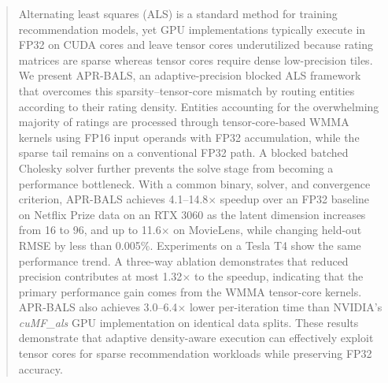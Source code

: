 \begin{abstract}
Alternating least squares (ALS) is a standard method for training recommendation models, yet GPU implementations typically execute in FP32 on CUDA cores and leave tensor cores underutilized because rating matrices are sparse whereas tensor cores require dense low-precision tiles. We present APR-BALS, an adaptive-precision blocked ALS framework that overcomes this sparsity–tensor-core mismatch by routing entities according to their rating density. Entities accounting for the overwhelming majority of ratings are processed through tensor-core-based WMMA kernels using FP16 input operands with FP32 accumulation, while the sparse tail remains on a conventional FP32 path. A blocked batched Cholesky solver further prevents the solve stage from becoming a performance bottleneck. With a common binary, solver, and convergence criterion, APR-BALS achieves 4.1--14.8$\times$ speedup over an FP32 baseline on Netflix Prize data on an RTX 3060 as the latent dimension increases from 16 to 96, and up to 11.6$\times$ on MovieLens, while changing held-out RMSE by less than 0.005\%. Experiments on a Tesla T4 show the same performance trend. A three-way ablation demonstrates that reduced precision contributes at most 1.32$\times$ to the speedup, indicating that the primary performance gain comes from the WMMA tensor-core kernels. APR-BALS also achieves 3.0--6.4$\times$ lower per-iteration time than NVIDIA's \textit{cuMF\_als} GPU implementation on identical data splits. These results demonstrate that adaptive density-aware execution can effectively exploit tensor cores for sparse recommendation workloads while preserving FP32 accuracy.

\end{abstract}
